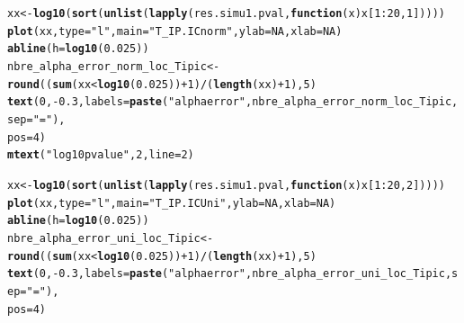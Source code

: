 \documentclass[12pt]{article}\usepackage[]{graphicx}\usepackage[]{color}
\makeatletter
\newcommand{\hlnum}[1]{\textcolor[rgb]{0.686,0.059,0.569}{#1}}%
\newcommand{\hlstr}[1]{\textcolor[rgb]{0.192,0.494,0.8}{#1}}%
\newcommand{\hlopt}[1]{\textcolor[rgb]{0,0,0}{#1}}%
\newcommand{\hlstd}[1]{\textcolor[rgb]{0.345,0.345,0.345}{#1}}%
\newcommand{\hlkwa}[1]{\textcolor[rgb]{0.161,0.373,0.58}{\textbf{#1}}}%
\newcommand{\hlkwb}[1]{\textcolor[rgb]{0.69,0.353,0.396}{#1}}%
\newcommand{\hlkwc}[1]{\textcolor[rgb]{0.333,0.667,0.333}{#1}}%
\newcommand{\hlkwd}[1]{\textcolor[rgb]{0.737,0.353,0.396}{\textbf{#1}}}%
\newenvironment{kframe}{%
 \def\at@end@of@kframe{}%
 \ifinner\ifhmode%
  \def\at@end@of@kframe{\end{minipage}}%
  \begin{minipage}{\columnwidth}%
 \fi\fi%
 \def\FrameCommand##1{\hskip\@totalleftmargin \hskip-\fboxsep
 \colorbox{shadecolor}{##1}\hskip-\fboxsep
     \hskip-\linewidth \hskip-\@totalleftmargin \hskip\columnwidth}%
 \MakeFramed {\advance\hsize-\width
   \@totalleftmargin\z@ \linewidth\hsize
   \@setminipage}}%
 {\par\unskip\endMakeFramed%
 \at@end@of@kframe}
\newenvironment{knitrout}{}{} %
\makeatother
\begin{document}
\begin{landscape}
\begin{knitrout}
\begin{kframe}
\begin{alltt}
\hlstd{xx} \hlkwb{<-} \hlkwd{log10}\hlstd{(}\hlkwd{sort}\hlstd{(}\hlkwd{unlist}\hlstd{(}\hlkwd{lapply}\hlstd{(res.simu1.pval,} \hlkwa{function}\hlstd{(}\hlkwc{x}\hlstd{) x[}\hlnum{1}\hlopt{:}\hlnum{20}\hlstd{,} \hlnum{1}\hlstd{]))))}
\hlkwd{plot}\hlstd{(xx,} \hlkwc{type} \hlstd{=} \hlstr{"l"}\hlstd{,} \hlkwc{main} \hlstd{=} \hlstr{"T_IP.IC norm"}\hlstd{,} \hlkwc{ylab} \hlstd{=} \hlnum{NA} \hlstd{,} \hlkwc{xlab} \hlstd{=} \hlnum{NA}\hlstd{)}
\hlkwd{abline}\hlstd{(}\hlkwc{h} \hlstd{=} \hlkwd{log10}\hlstd{(}\hlnum{0.025}\hlstd{))}
\hlstd{nbre_alpha_error_norm_loc_Tipic} \hlkwb{<-} \hlkwd{round}\hlstd{((}\hlkwd{sum}\hlstd{(xx} \hlopt{<} \hlkwd{log10}\hlstd{(}\hlnum{0.025}\hlstd{))} \hlopt{+}\hlnum{1} \hlstd{)} \hlopt{/} \hlstd{(}\hlkwd{length}\hlstd{(xx)}\hlopt{+}\hlnum{1}\hlstd{),} \hlnum{5}\hlstd{)}
\hlkwd{text}\hlstd{(}\hlnum{0}\hlstd{,} \hlopt{-}\hlnum{0.3}\hlstd{,} \hlkwc{labels} \hlstd{=} \hlkwd{paste}\hlstd{(}\hlstr{"alpha error"}\hlstd{, nbre_alpha_error_norm_loc_Tipic,} \hlkwc{sep} \hlstd{=} \hlstr{" = "}\hlstd{),}
     \hlkwc{pos} \hlstd{=} \hlnum{4}\hlstd{)}
\hlkwd{mtext}\hlstd{(}\hlstr{"log10 pvalue"}\hlstd{,} \hlnum{2}\hlstd{,} \hlkwc{line} \hlstd{=} \hlnum{2}\hlstd{)}

\hlstd{xx} \hlkwb{<-} \hlkwd{log10}\hlstd{(}\hlkwd{sort}\hlstd{(}\hlkwd{unlist}\hlstd{(}\hlkwd{lapply}\hlstd{(res.simu1.pval,} \hlkwa{function}\hlstd{(}\hlkwc{x}\hlstd{) x[}\hlnum{1}\hlopt{:}\hlnum{20}\hlstd{,} \hlnum{2}\hlstd{]))))}
\hlkwd{plot}\hlstd{(xx,} \hlkwc{type} \hlstd{=} \hlstr{"l"}\hlstd{,} \hlkwc{main} \hlstd{=} \hlstr{"T_IP.IC Uni"}\hlstd{,} \hlkwc{ylab} \hlstd{=} \hlnum{NA}\hlstd{,} \hlkwc{xlab} \hlstd{=} \hlnum{NA}\hlstd{)}
\hlkwd{abline}\hlstd{(}\hlkwc{h} \hlstd{=} \hlkwd{log10}\hlstd{(}\hlnum{0.025}\hlstd{))}
\hlstd{nbre_alpha_error_uni_loc_Tipic} \hlkwb{<-} \hlkwd{round}\hlstd{((}\hlkwd{sum}\hlstd{(xx} \hlopt{<} \hlkwd{log10}\hlstd{(}\hlnum{0.025}\hlstd{))} \hlopt{+}\hlnum{1} \hlstd{)} \hlopt{/} \hlstd{(}\hlkwd{length}\hlstd{(xx)}\hlopt{+}\hlnum{1}\hlstd{),} \hlnum{5}\hlstd{)}
\hlkwd{text}\hlstd{(}\hlnum{0}\hlstd{,} \hlopt{-}\hlnum{0.3}\hlstd{,} \hlkwc{labels} \hlstd{=} \hlkwd{paste}\hlstd{(}\hlstr{"alpha error"}\hlstd{, nbre_alpha_error_uni_loc_Tipic,} \hlkwc{sep} \hlstd{=} \hlstr{" = "}\hlstd{),}
     \hlkwc{pos} \hlstd{=} \hlnum{4}\hlstd{)}


\end{alltt}
\end{kframe}
\end{knitrout}
\end{landscape}
\end{document}
